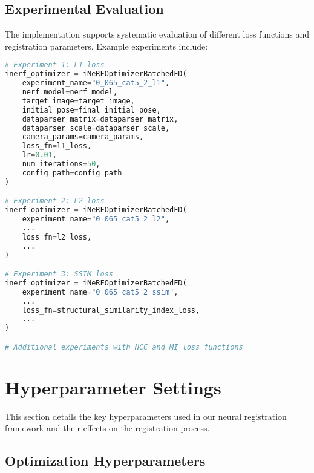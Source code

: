 \subsection{Experimental Evaluation}

The implementation supports systematic evaluation of different loss functions and registration parameters. Example experiments include:

\begin{lstlisting}[language=Python]
# Experiment 1: L1 loss
inerf_optimizer = iNeRFOptimizerBatchedFD(
    experiment_name="0_065_cat5_2_l1",
    nerf_model=nerf_model,
    target_image=target_image,
    initial_pose=final_initial_pose,
    dataparser_matrix=dataparser_matrix,
    dataparser_scale=dataparser_scale,
    camera_params=camera_params,
    loss_fn=l1_loss,
    lr=0.01,
    num_iterations=50,
    config_path=config_path
)

# Experiment 2: L2 loss
inerf_optimizer = iNeRFOptimizerBatchedFD(
    experiment_name="0_065_cat5_2_l2",
    ...
    loss_fn=l2_loss,
    ...
)

# Experiment 3: SSIM loss
inerf_optimizer = iNeRFOptimizerBatchedFD(
    experiment_name="0_065_cat5_2_ssim",
    ...
    loss_fn=structural_similarity_index_loss,
    ...
)

# Additional experiments with NCC and MI loss functions
\end{lstlisting}

\section{Hyperparameter Settings}\label{appendix:hyperparameters}

This section details the key hyperparameters used in our neural registration framework and their effects on the registration process.

\subsection{Optimization Hyperparameters}

